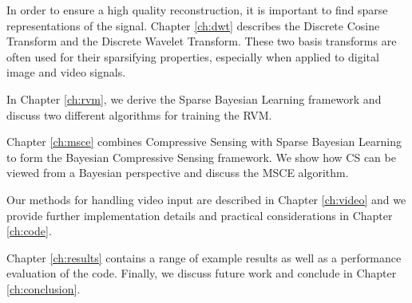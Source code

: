 In order to ensure a high quality reconstruction, it is important to find sparse representations of the signal.
Chapter \ref{ch:dwt} describes the Discrete Cosine Transform and the Discrete Wavelet Transform.
These two basis transforms are often used for their sparsifying properties, especially when applied to digital image and video signals.

In Chapter \ref{ch:rvm}, we derive the Sparse Bayesian Learning framework and discuss two different algorithms for training the RVM.

Chapter \ref{ch:msce} combines Compressive Sensing with Sparse Bayesian Learning to form the Bayesian Compressive Sensing framework.
We show how CS can be viewed from a Bayesian perspective and discuss the MSCE algorithm.

Our methods for handling video input are described in Chapter \ref{ch:video} and we provide further implementation details and practical considerations in Chapter \ref{ch:code}.

Chapter \ref{ch:results} contains a range of example results as well as a performance evaluation of the code.
Finally, we discuss future work and conclude in Chapter \ref{ch:conclusion}.

